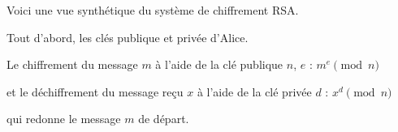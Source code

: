 



\diapo

Voici une vue synthétique du système de chiffrement RSA.

Tout d'abord, les clés publique et privée d'Alice.

Le chiffrement du message $m$ à l'aide de la clé publique $n$, $e$ : $m^e\pmod{n}$

et le déchiffrement du message reçu $x$ à l'aide de la clé privée $d$ : $x^d\pmod{n}$

qui redonne le message $m$ de départ.

% 
% 
% 
% 
% 
% 
% 
% 
% 
% 
% 
% 
% 
% 
% 
% 
%  
% 
%   
% 
% 
% 
% 
% 
% 
% 
%        
%       

\diapo

